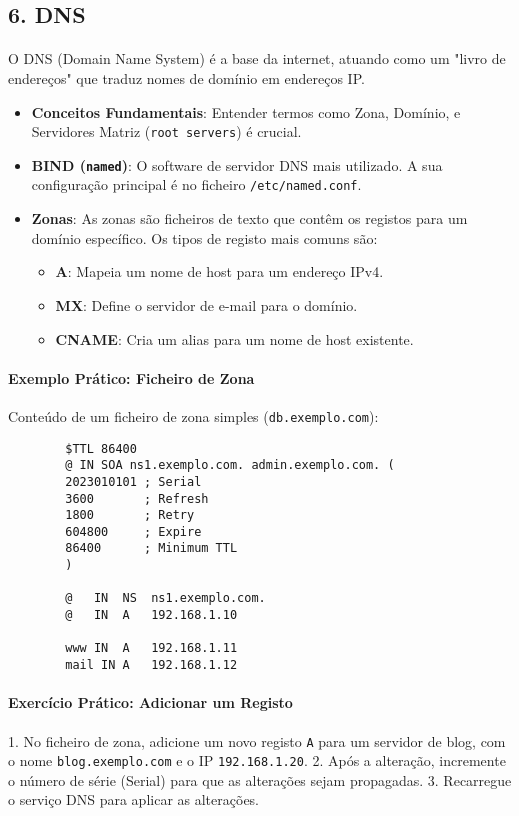 \documentclass[10pt,a4paper]{article}
\begin{document}
	\subsection*{6. DNS}
	\vspace{-1.2em}
	\paragraph{}
	O DNS (Domain Name System) é a base da internet, atuando como um "livro de endereços" que traduz nomes de domínio em endereços IP.
	
	\begin{itemize}
		\item \textbf{Conceitos Fundamentais}: Entender termos como Zona, Domínio, e Servidores Matriz (\texttt{root servers}) é crucial.
		\item \textbf{BIND (\texttt{named})}: O software de servidor DNS mais utilizado. A sua configuração principal é no ficheiro \texttt{/etc/named.conf}.
		\item \textbf{Zonas}: As zonas são ficheiros de texto que contêm os registos para um domínio específico. Os tipos de registo mais comuns são:
		\begin{itemize}
			\item \textbf{A}: Mapeia um nome de host para um endereço IPv4.
			\item \textbf{MX}: Define o servidor de e-mail para o domínio.
			\item \textbf{CNAME}: Cria um alias para um nome de host existente.
		\end{itemize}
	\end{itemize}
	
	\paragraph{\bfseries Exemplo Prático: Ficheiro de Zona}
	Conteúdo de um ficheiro de zona simples (\texttt{db.exemplo.com}):
	
	\begin{verbatim}
		$TTL 86400
		@ IN SOA ns1.exemplo.com. admin.exemplo.com. (
		2023010101 ; Serial
		3600       ; Refresh
		1800       ; Retry
		604800     ; Expire
		86400      ; Minimum TTL
		)
		
		@   IN  NS  ns1.exemplo.com.
		@   IN  A   192.168.1.10
		
		www IN  A   192.168.1.11
		mail IN A   192.168.1.12
	\end{verbatim}
	
	\paragraph{\bfseries Exercício Prático: Adicionar um Registo}
	1. No ficheiro de zona, adicione um novo registo \texttt{A} para um servidor de blog, com o nome \texttt{blog.exemplo.com} e o IP \texttt{192.168.1.20}.
	2. Após a alteração, incremente o número de série (Serial) para que as alterações sejam propagadas.
	3. Recarregue o serviço DNS para aplicar as alterações.
	
\end{document}
